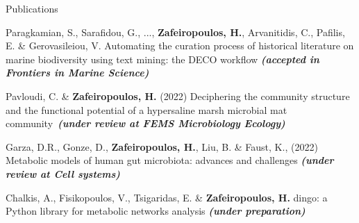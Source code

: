 \documentclass{beamer}
\begin{document}
\begin{frame}[label=bibliography]{Publications}
\begin{thebibliography}{9}
         \tiny 
         Paragkamian, S., Sarafidou, G., ..., \textbf{Zafeiropoulos, H.}, Arvanitidis, C., Pafilis, E. \& Gerovasileiou, V. 
         Automating the curation process of historical literature on marine biodiversity using text mining: the DECO workflow \textbf{\textit{(accepted in Frontiers in Marine Science)}}

         \tiny	
         Pavloudi, C. \& \textbf{Zafeiropoulos, H.} (2022) Deciphering the community structure and the functional potential of a hypersaline marsh microbial mat community~\textbf{\textit{(under review at FEMS Microbiology Ecology)}}

         \tiny
         Garza, D.R., Gonze, D., \textbf{Zafeiropoulos, H.}, Liu, B. \& Faust, K., (2022) Metabolic models of human gut microbiota: advances and challenges \textbf{\textit{(under review at Cell systems)}} 

         \tiny
         Chalkis, A., Fisikopoulos, V., Tsigaridas, E. \& \textbf{Zafeiropoulos, H.} dingo: a Python library for metabolic networks analysis \textit{\textbf{(under preparation)}}

      \end{thebibliography}

   \end{frame}

\end{document}
